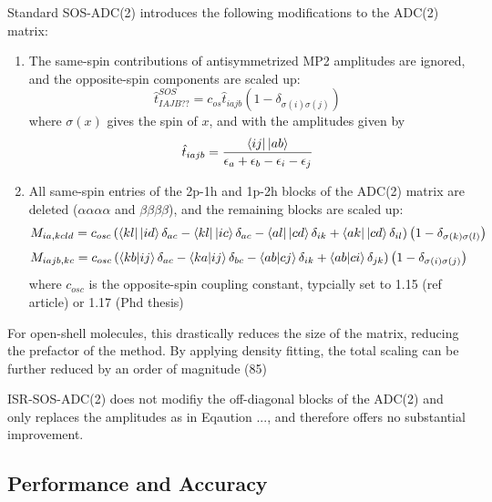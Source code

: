 Standard SOS-ADC(2) introduces the following modifications to the ADC(2) matrix:
\begin{enumerate}
\item The same-spin contributions of antisymmetrized MP2 amplitudes are ignored, and the opposite-spin components are scaled up:
\begin{equation}
\hat{t}_{IAJB??}^{SOS} = c_{os} \hat{t}_{iajb} \left( 1 - \delta _{\sigma (i) \sigma (j)} \right)
\end{equation}
where $\sigma (x)$ gives the spin of $x$, and with the amplitudes given by
\begin{equation}
\hat{t}_{iajb} = \frac{\bra{ij}{}\ket{ab}}{\epsilon_a + \epsilon_b - \epsilon_i - \epsilon_j}
\end{equation}
\item All same-spin entries of the 2p-1h and 1p-2h blocks of the ADC(2) matrix are deleted ($\alpha\alpha\alpha\alpha$ and $\beta\beta\beta\beta$), and the  remaining blocks are scaled up:
\begin{equation}
M_{ia,kcld} = c_{osc} \left( \bra{kl}{}\ket{id} \delta_{ac} - \bra{kl}{}\ket{ic} \delta_{ac} - \bra{al}{}\ket{cd} \delta_{ik} + \bra{ak}{}\ket{cd} \delta_{il} \right) \left( 1 - \delta_{\sigma (k) \sigma (l)} \right)
\end{equation}
\begin{equation}
M_{iajb,kc} = c_{osc} \left( \bra{kb} \ket{ij} \delta_{ac} - \bra{ka} \ket{ij} \delta_{bc} - \bra{ab} \ket{cj} \delta_{ik} + \bra{ab} \ket{ci} \delta_{jk} \right) \left( 1 - \delta_{\sigma (i) \sigma (j)} \right)
\end{equation}
\noindent where $c_{osc}$ is the opposite-spin coupling constant, typcially set to 1.15 (ref article) or 1.17 (Phd thesis)
\end{enumerate}

\noindent For open-shell molecules, this drastically reduces the size of the matrix, reducing the prefactor of the method. By applying density fitting, the total scaling can be further reduced by an order of magnitude (85)

ISR-SOS-ADC(2) does not modifiy the off-diagonal blocks of the ADC(2) and only replaces the amplitudes as in Eqaution ..., and therefore offers no substantial improvement. 


\subsection{Performance and Accuracy}

